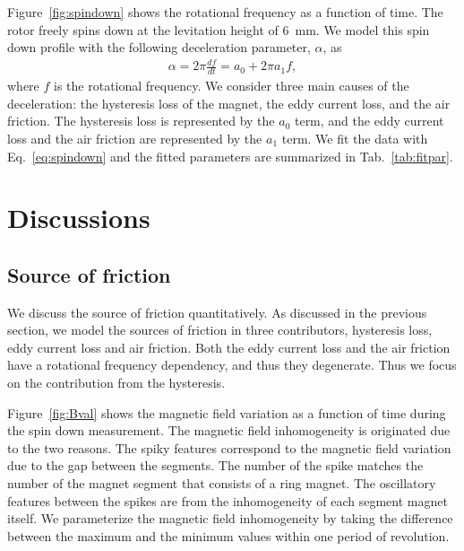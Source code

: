 \documentclass[journal]{IEEEtran}
\begin{document}
Figure~\ref{fig:spindown} shows the rotational frequency as a function of time.
The rotor freely spins down at the levitation height of 6~mm.
We model this spin down profile with the following deceleration parameter, $\alpha$, as
\begin{eqnarray}
\alpha = 2\pi \frac{df}{dt} = a_0 + 2\pi a_1 f,
\label{eq:spindown}
\end{eqnarray}
where $f$ is the rotational frequency\cite{hull_review}.
We consider three main causes of the deceleration: the hysteresis loss of the magnet, the eddy current loss, and the air friction.
The hysteresis loss is represented by the $a_0$ term, and the eddy current loss and the air friction are represented by the $a_1$ term.
We fit the data with Eq.~\ref{eq:spindown} and the fitted parameters are summarized in Tab.~\ref{tab:fitpar}.

\section{Discussions}

\subsection{Source of friction}
We discuss the source of friction quantitatively.
As discussed in the previous section, we model the sources of friction in three contributors, hysteresis loss, eddy current loss and air friction.
Both the eddy current loss and the air friction have a rotational frequency dependency, and thus they degenerate.
Thus we focus on the contribution from the hysteresis.

Figure~\ref{fig:Bval} shows the magnetic field variation as a function of time during the spin down measurement.
The magnetic field inhomogeneity is originated due to the two reasons.
The spiky features correspond to the magnetic field variation due to the gap between the segments.
The number of the spike matches the number of the magnet segment that consists of a ring magnet.
The oscillatory features between the spikes are from the inhomogeneity of each segment magnet itself.
We parameterize the magnetic field inhomogeneity by taking the difference between the maximum and the minimum values within one period of revolution.
\end{document}
